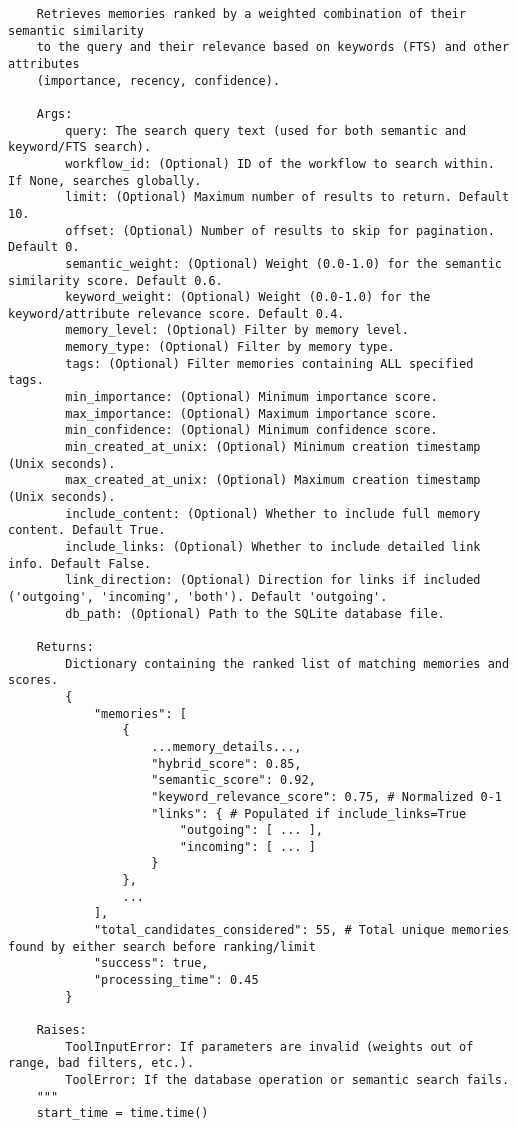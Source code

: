 \documentclass[12pt,a4paper]{article}
\begin{document}
\begin{pageablecode}
\begin{verbatim}
    Retrieves memories ranked by a weighted combination of their semantic similarity
    to the query and their relevance based on keywords (FTS) and other attributes
    (importance, recency, confidence).

    Args:
        query: The search query text (used for both semantic and keyword/FTS search).
        workflow_id: (Optional) ID of the workflow to search within. If None, searches globally.
        limit: (Optional) Maximum number of results to return. Default 10.
        offset: (Optional) Number of results to skip for pagination. Default 0.
        semantic_weight: (Optional) Weight (0.0-1.0) for the semantic similarity score. Default 0.6.
        keyword_weight: (Optional) Weight (0.0-1.0) for the keyword/attribute relevance score. Default 0.4.
        memory_level: (Optional) Filter by memory level.
        memory_type: (Optional) Filter by memory type.
        tags: (Optional) Filter memories containing ALL specified tags.
        min_importance: (Optional) Minimum importance score.
        max_importance: (Optional) Maximum importance score.
        min_confidence: (Optional) Minimum confidence score.
        min_created_at_unix: (Optional) Minimum creation timestamp (Unix seconds).
        max_created_at_unix: (Optional) Maximum creation timestamp (Unix seconds).
        include_content: (Optional) Whether to include full memory content. Default True.
        include_links: (Optional) Whether to include detailed link info. Default False.
        link_direction: (Optional) Direction for links if included ('outgoing', 'incoming', 'both'). Default 'outgoing'.
        db_path: (Optional) Path to the SQLite database file.

    Returns:
        Dictionary containing the ranked list of matching memories and scores.
        {
            "memories": [
                {
                    ...memory_details...,
                    "hybrid_score": 0.85,
                    "semantic_score": 0.92,
                    "keyword_relevance_score": 0.75, # Normalized 0-1
                    "links": { # Populated if include_links=True
                        "outgoing": [ ... ],
                        "incoming": [ ... ]
                    }
                },
                ...
            ],
            "total_candidates_considered": 55, # Total unique memories found by either search before ranking/limit
            "success": true,
            "processing_time": 0.45
        }

    Raises:
        ToolInputError: If parameters are invalid (weights out of range, bad filters, etc.).
        ToolError: If the database operation or semantic search fails.
    """
    start_time = time.time()


\end{verbatim}
\end{pageablecode}
\end{document}

